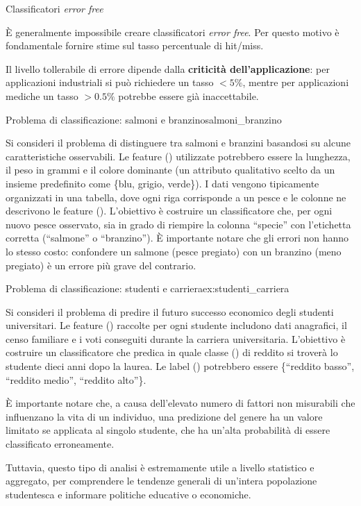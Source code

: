 \begin{nota}{Classificatori \textit{error free}}{}

    È generalmente impossibile creare classificatori \textit{error free}.
    Per questo motivo è fondamentale fornire stime sul tasso percentuale di
    hit/miss.

    Il livello tollerabile di errore dipende dalla \textbf{criticità
    dell'applicazione}: per applicazioni industriali si può richiedere un
    tasso $< 5\%$, mentre per applicazioni mediche un tasso $> 0.5\%$
    potrebbe essere già inaccettabile.

\end{nota}

\begin{esempio}{Problema di classificazione: salmoni e branzino}{salmoni_branzino}

Si consideri il problema di distinguere tra salmoni e branzini basandosi
su alcune caratteristiche osservabili.
Le feature () utilizzate potrebbero essere la lunghezza, il peso in grammi
e il colore dominante (un attributo qualitativo scelto da un insieme predefinito
come \{blu, grigio, verde\}).
I dati vengono tipicamente organizzati in una tabella, dove ogni riga corrisponde
a un pesce e le colonne ne descrivono le feature ().
L'obiettivo è costruire un classificatore che, per ogni nuovo pesce osservato,
sia in grado di riempire la colonna ``specie'' con l'etichetta corretta
(``salmone'' o ``branzino'').
È importante notare che gli errori non hanno lo stesso costo: confondere un
salmone (pesce pregiato) con un branzino (meno pregiato) è un errore più grave
del contrario.

\end{esempio}

\begin{esempio}{Problema di classificazione: studenti e carriera}{ex:studenti_carriera}

Si consideri il problema di predire il futuro successo economico degli studenti
universitari.
Le feature () raccolte per ogni studente includono dati anagrafici, il
censo familiare e i voti conseguiti durante la carriera universitaria.
L'obiettivo è costruire un classificatore che predica in quale classe ()
di reddito si troverà lo studente dieci anni dopo la laurea. Le label ()
potrebbero essere \{``reddito basso'', ``reddito medio'', ``reddito alto''\}.

È importante notare che, a causa dell'elevato numero di fattori non misurabili
che influenzano la vita di un individuo, una predizione del genere ha un valore
limitato se applicata al singolo studente, che ha un'alta probabilità di essere
classificato erroneamente.

Tuttavia, questo tipo di analisi è estremamente utile a livello statistico e
aggregato, per comprendere le tendenze generali di un'intera popolazione
studentesca e informare politiche educative o economiche.

\end{esempio}

